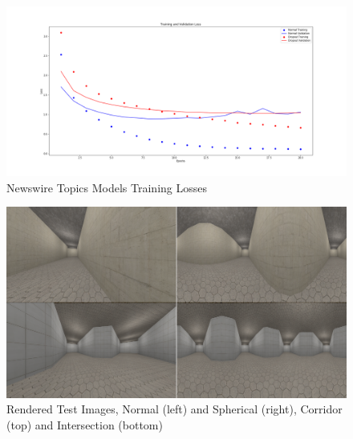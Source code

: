 \documentclass[sigconf, nonacm]{acmart}
\begin{document}
\begin{figure}[h]
  \centering
  \includegraphics[width=\linewidth]{classifyNewswireTopics_Loss}
  \caption{Newswire Topics Models Training Losses}
  \label{fig:NewswireLoss}
\end{figure}

\begin{figure}[h]
  \centering
  \includegraphics[width=\linewidth]{Blender_NormalPanoComparison}
  \caption{Rendered Test Images, Normal (left) and Spherical (right), Corridor (top) and Intersection (bottom)}
  \label{fig:RenderSample}
\end{figure}
\end{document}
